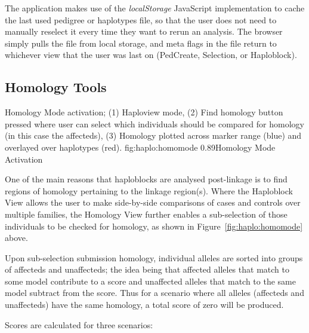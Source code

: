 The application makes use of the \textit{localStorage} JavaScript implementation to cache the last used pedigree or haplotypes file, so that the user does not need to manually reselect it every time they want to rerun an analysis. The browser simply pulls the file from local storage, and meta flags in the file return to whichever view that the user was last on (PedCreate, Selection, or Haploblock).

\subsection{Homology Tools}

	{Homology Mode activation; (1) Haploview mode, (2) Find homology button pressed where user can select which individuals should be compared for homology (in this case the affecteds), (3) Homology plotted across marker range (blue) and overlayed over haplotypes (red).}
	{fig:haplo:homomode}
	{0.89}{Homology Mode Activation}


One of the main reasons that haploblocks are analysed post-linkage is to find regions of homology pertaining to the linkage region(s). Where the Haploblock View allows the user to make side-by-side comparisons of cases and controls over multiple families, the Homology View further enables a sub-selection of those individuals to be checked for homology, as shown in Figure~\ref{fig:haplo:homomode} above.

Upon sub-selection submission homology, individual alleles are sorted into groups of affecteds and unaffecteds; the idea being that affected alleles that match to some model contribute to a score and unaffected alleles that match to the same model subtract from the score. Thus for a scenario where all alleles (affecteds and unaffecteds) have the same homology, a total score of zero will be produced. 

Scores are calculated for three scenarios:
\begin{enumerate}\label{ref:haplo:homologyscoredet}
\end{enumerate}

